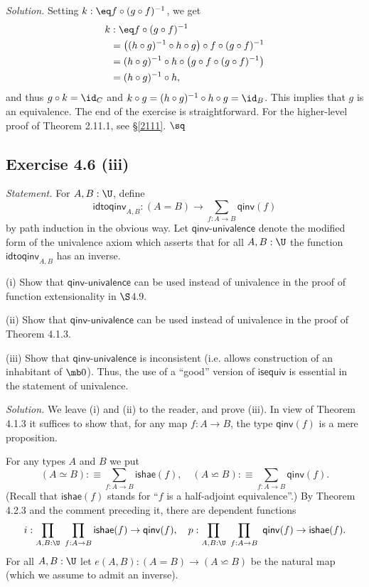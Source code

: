 \documentclass[12pt]{article}
\begin{document}
\nn\emph{Solution.} Setting $k:\eq f\circ (g\circ f)^{-1}$, we get 
\begin{align*}
k&:\eq f\circ (g\circ f)^{-1}\\
&=\big((h\circ g)^{-1}\circ h\circ g\big)\circ f\circ (g\circ f)^{-1}\\
&=(h\circ g)^{-1}\circ h\circ\big(g\circ f\circ (g\circ f)^{-1}\big)\\
&=(h\circ g)^{-1}\circ h,
\end{align*}
and thus $g\circ k=\id_C$ and $k\circ g=(h\circ g)^{-1}\circ h\circ g=\id_B$. This implies that $g$ is an equivalence. The end of the exercise is straightforward. For the higher-level proof of Theorem 2.11.1, see \S\ref{2111}. $\sq$


\subsection{Exercise 4.6 (iii)}

\emph{Statement.} For $A,B:\U$, define
$$
\mathsf{idtoqinv}_{A,B}:(A=B)\to\sum_{f:A\to B}\mathsf{qinv}(f)
$$
by path induction in the obvious way. Let $\mathsf{qinv}$-$\mathsf{univalence}$ denote the modified form of the univalence axiom which asserts that for all $A,B:\U$ the function $\mathsf{idtoqinv}_{A,B}$ has an inverse.

\nn(i) Show that $\mathsf{qinv}$-$\mathsf{univalence}$ can be used instead of univalence in the proof of function extensionality in $\S$4.9.

\nn(ii) Show that $\mathsf{qinv}$-$\mathsf{univalence}$ can be used instead of univalence in the proof of Theorem 4.1.3.

\nn(iii) Show that $\mathsf{qinv}$-$\mathsf{univalence}$ is inconsistent (i.e. allows construction of an inhabitant of $\mb0$). Thus, the use of a ``good'' version of $\mathsf{isequiv}$ is essential in the statement of univalence.

\nn\emph{Solution.} We leave (i) and (ii) to the reader, and prove (iii). In view of Theorem 4.1.3 it suffices to show that, for any map $f:A\to B$, the type $\mathsf{qinv}(f)$ is a mere proposition. 

For any types $A$ and $B$ we put 
$$
(A\simeq B):\equiv\sum_{f:A\to B}\mathsf{ishae}(f),\quad(A\backsimeq B):\equiv\sum_{f:A\to B}\mathsf{qinv}(f).
$$ 
(Recall that $\mathsf{ishae}(f)$ stands for ``$f$ is a half-adjoint equivalence''.) By Theorem 4.2.3 and the comment preceding it, there are dependent functions 
$$
i:\prod_{A,B:\U}\ \prod_{f:A\to B}\mathsf{ishae}(f)\to\mathsf{qinv}(f),\quad p:\prod_{A,B:\U}\ \prod_{f:A\to B}\ \mathsf{qinv}(f)\to\mathsf{ishae}(f).
$$ 
For all $A,B:\U$ let $e(A,B):(A=B)\to(A\backsimeq B)$ be the natural map (which we assume to admit an inverse).
\end{document}
